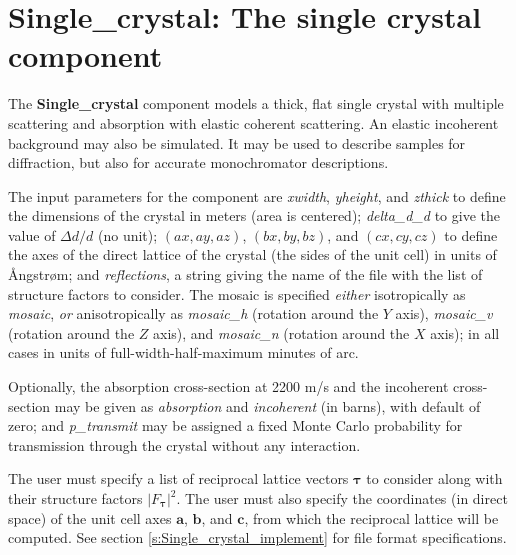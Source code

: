 \section{Single\_crystal: The single crystal component}
\label{s:Single_crystal}


The {\bf Single\_crystal} component models a thick, flat single crystal
with multiple scattering and absorption with elastic coherent scattering.
An elastic incoherent background may also be simulated.
It may be used to describe samples for diffraction,
but also for accurate monochromator descriptions.

The input parameters for the component are \textit{xwidth},
\textit{yheight}, and \textit{zthick} to define the dimensions of the
crystal in meters (area is centered); \textit{delta\_d\_d} to give the
value of $\Delta d/d$ (no unit);
$(\textit{ax}, \textit{ay}, \textit{az})$, $(\textit{bx}, \textit{by},
\textit{bz})$, and $(\textit{cx}, \textit{cy}, \textit{cz})$ to define
the axes of the direct lattice of the crystal (the sides of the unit
cell) in units of {\AA}ngstr{\o}m; and \textit{reflections}, a string
giving the name of the file with the list of structure factors to
consider.
The mosaic is specified \emph{either} isotropically as
\textit{mosaic}, \emph{or} anisotropically as \textit{mosaic\_h}
(rotation around the $Y$ axis), \textit{mosaic\_v} (rotation around the
$Z$ axis), and \textit{mosaic\_n} (rotation around the $X$ axis); in all
cases in units of full-width-half-maximum minutes of arc.

Optionally, the absorption cross-section at 2200 m/s and the incoherent
cross-section may be given as \textit{absorption} and
\textit{incoherent} (in barns), with default of zero; and
\textit{p\_transmit} may be assigned a fixed Monte Carlo probability for
transmission through the crystal without any interaction.

The user must specify a list of reciprocal lattice vectors
$\boldsymbol{\tau}$ to consider along with their structure factors
$|F_{\boldsymbol{\tau}}|^2$. The user must also specify the coordinates
(in direct space) of the unit cell axes $\boldsymbol{a}$,
$\boldsymbol{b}$, and $\boldsymbol{c}$, from which the reciprocal lattice
will be computed. See section \ref{s:Single_crystal_implement} for file format specifications.

